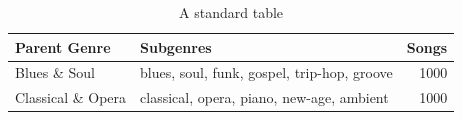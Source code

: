 \documentclass[../main.tex]{subfiles}
\begin{document}
\begin{table}[H]
    \centering
    \begin{tabularx}{\textwidth}{|l|X|r|}
        \hline
        \rowcolor{gray!50}
        \textbf{Parent Genre} & \textbf{Subgenres} & \textbf{Songs} \\
        \hline
        Blues \& Soul & blues, soul, funk, gospel, trip-hop, groove & 1000 \\
        \hline
        \rowcolor{gray!20}
        Classical \& Opera & classical, opera, piano, new-age, ambient & 1000 \\
        \hline
    \end{tabularx}
    \caption{A standard table}
    \label{tab:table}
\end{table}
\end{document}
